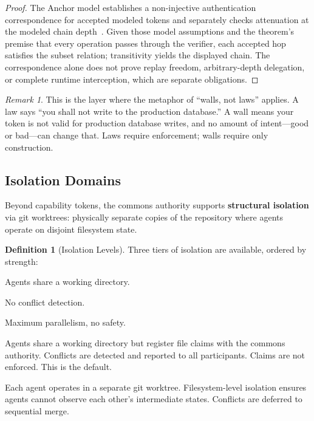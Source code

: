 \documentclass[11pt,a4paper]{article}
\theoremstyle{definition}
\newtheorem{definition}{Definition}[section]
\theoremstyle{remark}
\newtheorem*{remark}{Remark}
\begin{document}
\begin{proof}
\setlength{\parskip}{4pt plus 1pt}
The Anchor model establishes a non-injective authentication correspondence for accepted modeled tokens and separately checks attenuation at the modeled chain depth~. Given those model assumptions and the theorem's premise that every operation passes through the verifier, each accepted hop satisfies the subset relation; transitivity yields the displayed chain. The correspondence alone does not prove replay freedom, arbitrary-depth delegation, or complete runtime interception, which are separate obligations.
\end{proof}

\begin{remark}
This is the layer where the metaphor of ``walls, not laws'' applies. A law says ``you shall not write to the production database.'' A wall means your token is not valid for production database writes, and no amount of intent---good or bad---can change that. Laws require enforcement; walls require only construction.
\end{remark}

\pdexercisepointerone{\ref{ex:bonded-cap-attenuation}}{\pageref{ex:bonded-cap-attenuation}}

\subsection{Isolation Domains}\label{sec:isolation}

Beyond capability tokens, the commons authority supports \textbf{structural isolation} via git worktrees: physically separate copies of the repository where agents operate on disjoint filesystem state.

\begin{definition}[Isolation Levels]\label{def:isolation}
\setlength{\parskip}{4pt plus 1pt}
Three tiers of isolation are available, ordered by strength:
\begin{description}[nosep]
  \item[$I_0$ (None):] Agents share a working directory. 

No conflict detection. 

Maximum parallelism, no safety.
  \item[$I_1$ (Advisory):] Agents share a working directory but register file claims with the commons authority. Conflicts are detected and reported to all participants. Claims are not enforced. This is the default.
  \item[$I_2$ (Structural):] Each agent operates in a separate git worktree. Filesystem-level isolation ensures agents cannot observe each other's intermediate states. Conflicts are deferred to sequential merge.
\end{description}
\end{definition}
\end{document}
